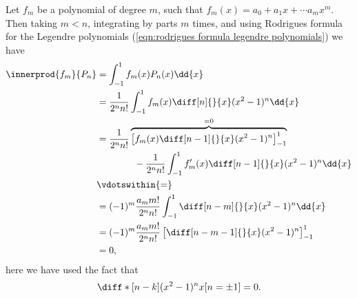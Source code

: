 \documentclass[fleqn]{NotesClass}
\begin{document}
    Let \(f_m\) be a polynomial of degree \(m\), such that \(f_m(x) = a_0 + a_1x + \dotsb a_mx^m\).
    Then taking \(m < n\), integrating by parts \(m\) times, and using Rodrigues formula for the Legendre polynomials (\cref{eqn:rodrigues formula legendre polynomials}) we have
    \begin{align}\label{eqn:inner prod polynomial and legendre polynomial}
        \innerprod{f_m}{P_n} &= \int_{-1}^{1} f_m(x) P_n(x)\dd{x}\\
        &= \frac{1}{2^nn!} \int_{-1}^{1} f_m(x) \diff[n]{}{x}(x^2 - 1)^n \dd{x}\\
        &= \frac{1}{2^nn!} \overbrace{\left[ f_m(x) \diff[n-1]{}{x}(x^2 - 1)^n \right]_{-1}^{1}}^{=0}\\
        &\qquad\qquad- \frac{1}{2^nn!} \int_{-1}^{1} f_m'(x) \diff[n - 1]{}{x} (x^2 - 1)^n \dd{x}\\
        &\vdotswithin{=}\\
        &= (-1)^m \frac{a_mm!}{2^nn!} \int_{-1}^{1} \diff[n-m]{}{x}(x^2 - 1)^n \dd{x}\\
        &= (-1)^m \frac{a_mm!}{2^nn!} \left[ \diff[n-m-1]{}{x} (x^2 - 1)^n \right]_{-1}^{1}\\
        &= 0,
    \end{align}
    here we have used the fact that
    \begin{equation}
        \diff*[n - k]{(x^2 - 1)^n}{x}[n=\pm 1] = 0.
    \end{equation}
    
\end{document}
